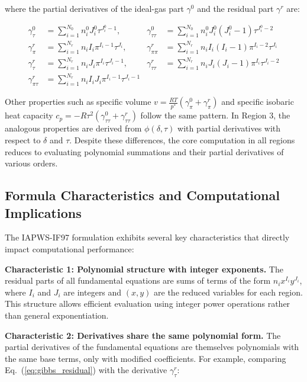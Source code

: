 \documentclass{article}
\begin{document}
where the partial derivatives of the ideal-gas part $\gamma^0$ and the residual part $\gamma^r$ are:

\begin{align}
\gamma^0_\tau &= \sum_{i=1}^{N_0} n_i^0 J_i^0 \tau^{J_i^0 - 1}, &
\gamma^0_{\tau\tau} &= \sum_{i=1}^{N_0} n_i^0 J_i^0 (J_i^0 - 1) \tau^{J_i^0 - 2} \\
\gamma^r_\pi &= \sum_{i=1}^{N_r} n_i I_i \pi^{I_i - 1} \tau^{J_i}, &
\gamma^r_{\pi\pi} &= \sum_{i=1}^{N_r} n_i I_i (I_i - 1) \pi^{I_i - 2} \tau^{J_i} \\
\gamma^r_\tau &= \sum_{i=1}^{N_r} n_i J_i \pi^{I_i} \tau^{J_i - 1}, &
\gamma^r_{\tau\tau} &= \sum_{i=1}^{N_r} n_i J_i (J_i - 1) \pi^{I_i} \tau^{J_i - 2} \\
\gamma^r_{\pi\tau} &= \sum_{i=1}^{N_r} n_i I_i J_i \pi^{I_i - 1} \tau^{J_i - 1}
\end{align}

Other properties such as specific volume $v = \frac{RT}{p^*}(\gamma^0_\pi + \gamma^r_\pi)$ and specific isobaric heat capacity $c_p = -R\tau^2(\gamma^0_{\tau\tau} + \gamma^r_{\tau\tau})$ follow the same pattern. In Region 3, the analogous properties are derived from $\phi(\delta,\tau)$ with partial derivatives with respect to $\delta$ and $\tau$. Despite these differences, the core computation in all regions reduces to evaluating polynomial summations and their partial derivatives of various orders.

\subsection{Formula Characteristics and Computational Implications}

The IAPWS-IF97 formulation exhibits several key characteristics that directly impact computational performance:

\textbf{Characteristic 1: Polynomial structure with integer exponents.} The residual parts of all fundamental equations are sums of terms of the form $n_i x^{I_i} y^{J_i}$, where $I_i$ and $J_i$ are integers and $(x, y)$ are the reduced variables for each region. This structure allows efficient evaluation using integer power operations rather than general exponentiation.

\textbf{Characteristic 2: Derivatives share the same polynomial form.} The partial derivatives of the fundamental equations are themselves polynomials with the same base terms, only with modified coefficients. For example, comparing Eq.~(\ref{eq:gibbs_residual}) with the derivative $\gamma^r_\tau$:
\end{document}
